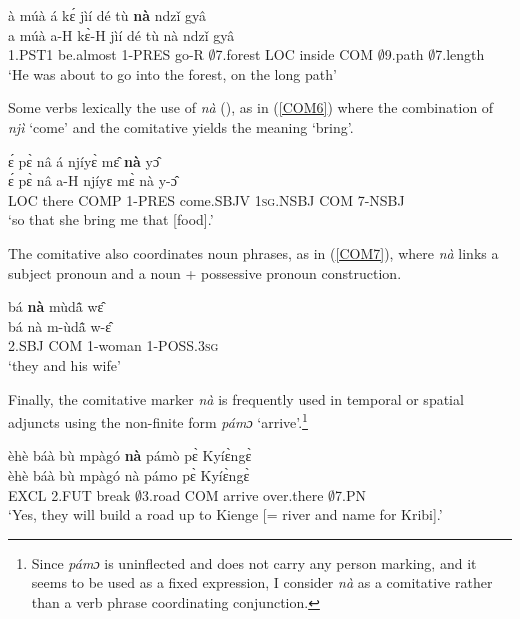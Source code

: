 \begin{exe} 
\ex\label{COM5}
  \glll  à múà á kɛ́ jìí dé tù {\bfseries nà} ndzǐ gyâ    \\
          a múà a-H kɛ̀-H jìí dé tù nà ndzǐ gyâ      \\
       1.PST1 be.almost 1-PRES go-R $\emptyset$7.forest LOC inside COM $\emptyset$9.path $\emptyset$7.length \\
    \trans `He was about to go into the forest, on the long path'
\end{exe}

Some verbs lexically the use of {\itshape nà} (), as in (\ref{COM6}) where the combination of {\itshape njì} `come' and the comitative yields the meaning `bring'.

\begin{exe} 
\ex\label{COM6} 
  \glll   ɛ́ pɛ̀ nâ á njíyɛ̀ mɛ̂ {\bfseries nà} yɔ̂ \\
         ɛ́ pɛ̀ nâ a-H njíyɛ mɛ̀ nà y-ɔ̂ \\
         LOC there COMP 1-PRES come.SBJV 1\textsc{sg}.NSBJ COM 7-NSBJ  \\
    \trans `so that she bring me that [food].'
\end{exe}


The comitative also coordinates noun phrases, as in (\ref{COM7}), where {\itshape nà} links a subject pronoun and a noun + possessive pronoun construction.

\begin{exe} 
\ex\label{COM7}
  \glll  bá {\bfseries nà} mùdã̂ wɛ̂ \\
         bá nà m-ùdã̂ w-ɛ̂\\
           2.SBJ COM 1-woman 1-POSS.3\textsc{sg}  \\
    \trans `they and his wife'
\end{exe}

Finally, the comitative marker {\itshape nà} is frequently used in temporal or spatial adjuncts using the non-finite form {\itshape pámɔ} `arrive'.\footnote{Since {\itshape pámɔ} is uninflected and does not carry any person marking, and it seems to be used as a fixed expression, I consider {\itshape nà} as a comitative rather than a verb phrase coordinating conjunction.}

\begin{exe} 
\ex\label{COM8} 
  \glll èhè báà bù mpàgó {\bfseries nà} pámò pɛ̀ Kyíɛ̀ngɛ̀ \\
        èhè báà bù mpàgó nà pámo pɛ̀ Kyíɛ̀ngɛ̀ \\
        EXCL 2.FUT break $\emptyset$3.road COM arrive over.there $\emptyset$7.PN  \\
    \trans `Yes, they will build a road up to Kienge [= river and name for Kribi].'
\end{exe}







